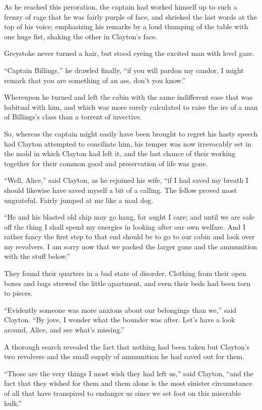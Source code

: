As he reached this peroration, the captain had worked himself up to such a frenzy of rage that he was fairly purple of face, and shrieked the last words at the top of his voice; emphasizing his remarks by a loud thumping of the table with one huge fist, shaking the other in Clayton’s face.

Greystoke never turned a hair, but stood eyeing the excited man with level gaze.

“Captain Billings,” he drawled finally, “if you will pardon my candor, I might remark that you are something of an ass, don’t you know.”

Whereupon he turned and left the cabin with the same indifferent ease that was habitual with him, and which was more surely calculated to raise the ire of a man of Billings’s class than a torrent of invective.

So, whereas the captain might easily have been brought to regret his hasty speech had Clayton attempted to conciliate him, his temper was now irrevocably set in the mold in which Clayton had left it, and the last chance of their working together for their common good and preservation of life was gone.

“Well, Alice,” said Clayton, as he rejoined his wife, “if I had saved my breath I should likewise have saved myself a bit of a calling. The fellow proved most ungrateful. Fairly jumped at me like a mad dog.

“He and his blasted old ship may go hang, for aught I care; and until we are safe off the thing I shall spend my energies in looking after our own welfare. And I rather fancy the first step to that end should be to go to our cabin and look over my revolvers. I am sorry now that we packed the larger guns and the ammunition with the stuff below.”

They found their quarters in a bad state of disorder. Clothing from their open boxes and bags strewed the little apartment, and even their beds had been torn to pieces.

“Evidently someone was more anxious about our belongings than we,” said Clayton. “By jove, I wonder what the bounder was after. Let’s have a look around, Alice, and see what’s missing.”

A thorough search revealed the fact that nothing had been taken but Clayton’s two revolvers and the small supply of ammunition he had saved out for them.

“Those are the very things I most wish they had left us,” said Clayton, “and the fact that they wished for them and them alone is the most sinister circumstance of all that have transpired to endanger us since we set foot on this miserable hulk.”

